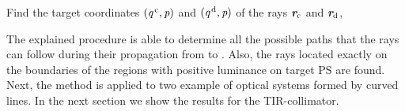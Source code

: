 \begin{algorithm}
\begin{algorithmic}[1]
\State Find the target coordinates $(\textit{q}^{\,\textrm{c}},\textit{p})$ and $(\textit{q}^{\,\textrm{d}},\textit{p})$ of the rays $\textit{\textbf{r}}_{\textrm{c}}$ and $\textit{\textbf{r}}_{\textrm{d}}$, 
\If {$\lineaj\neq \nline$}
\State{}
\EndIf 
\State{}
\EndIf
\EndProcedure
\end{algorithmic}
\end{algorithm}
The explained procedure is able to determine all the possible paths that the rays can follow during their propagation from  to . Also, the rays located exactly on the boundaries of the regions with positive luminance on target PS  are found.\\ \indent
Next, the method is applied to two example of optical systems formed by curved lines. In the next section we show the results for the TIR-collimator.
